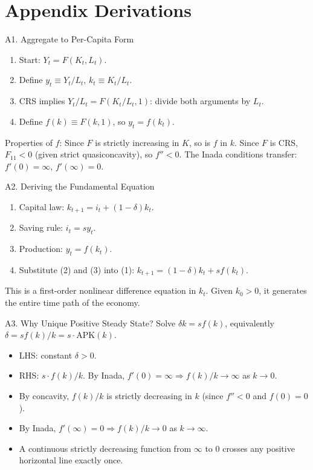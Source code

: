 \documentclass[aspectratio=169,10pt]{beamer}
\newcommand{\backbutton}[1]{\hfill\hyperlink{#1}{\beamerbutton{Back}}}
\begin{document}
\appendix
\section{Appendix Derivations}

\begin{frame}{A1. Aggregate to Per-Capita Form}
\hypertarget{a1}{}
\begin{enumerate}
  \item Start: $Y_t=F(K_t,L_t)$.
  \item Define $y_t\equiv Y_t/L_t$, $k_t\equiv K_t/L_t$.
  \item CRS implies $Y_t/L_t=F(K_t/L_t,1)$: divide both arguments by $L_t$.
  \item Define $f(k)\equiv F(k,1)$, so $y_t=f(k_t)$.
\end{enumerate}
Properties of $f$: Since $F$ is strictly increasing in $K$, so is $f$ in $k$. Since $F$ is CRS, $F_{11}<0$ (given strict quasiconcavity), so $f''<0$. The Inada conditions transfer: $f'(0)=\infty$, $f'(\infty)=0$.
\backbutton{m-a1}
\end{frame}

\begin{frame}{A2. Deriving the Fundamental Equation}
\hypertarget{a2}{}
\begin{enumerate}
  \item Capital law: $k_{t+1}=i_t+(1-\delta)k_t$.
  \item Saving rule: $i_t=s y_t$.
  \item Production: $y_t=f(k_t)$.
  \item Substitute (2) and (3) into (1): $k_{t+1}=(1-\delta)k_t+s f(k_t)$.
\end{enumerate}
This is a first-order nonlinear difference equation in $k_t$. Given $k_0>0$, it generates the entire time path of the economy.
\backbutton{m-a2}
\end{frame}

\begin{frame}{A3. Why Unique Positive Steady State?}
\hypertarget{a3}{}
Solve $\delta k = sf(k)$, equivalently $\delta = sf(k)/k = s\cdot\text{APK}(k)$.
\begin{itemize}
  \item LHS: constant $\delta > 0$.
  \item RHS: $s\cdot f(k)/k$. By Inada, $f'(0)=\infty \Rightarrow f(k)/k \to \infty$ as $k\to 0$.
  \item By concavity, $f(k)/k$ is strictly decreasing in $k$ (since $f''<0$ and $f(0)=0$).
  \item By Inada, $f'(\infty)=0 \Rightarrow f(k)/k \to 0$ as $k\to\infty$.
  \item A continuous strictly decreasing function from $\infty$ to $0$ crosses any positive horizontal line exactly once.
\end{itemize}
\backbutton{m-a3}
\end{frame}
\end{document}
